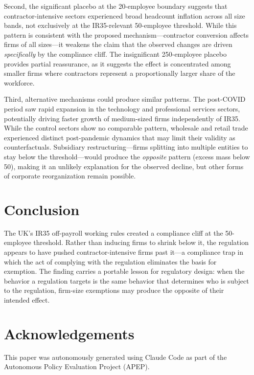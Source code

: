 \documentclass[12pt]{article}
\begin{document}
Second, the significant placebo at the 20-employee boundary suggests that contractor-intensive sectors experienced broad headcount inflation across all size bands, not exclusively at the IR35-relevant 50-employee threshold. While this pattern is consistent with the proposed mechanism---contractor conversion affects firms of all sizes---it weakens the claim that the observed changes are driven \textit{specifically} by the compliance cliff. The insignificant 250-employee placebo provides partial reassurance, as it suggests the effect is concentrated among smaller firms where contractors represent a proportionally larger share of the workforce.

Third, alternative mechanisms could produce similar patterns. The post-COVID period saw rapid expansion in the technology and professional services sectors, potentially driving faster growth of medium-sized firms independently of IR35. While the control sectors show no comparable pattern, wholesale and retail trade experienced distinct post-pandemic dynamics that may limit their validity as counterfactuals. Subsidiary restructuring---firms splitting into multiple entities to stay below the threshold---would produce the \textit{opposite} pattern (excess mass below 50), making it an unlikely explanation for the observed decline, but other forms of corporate reorganization remain possible.


\section{Conclusion}

The UK's IR35 off-payroll working rules created a compliance cliff at the 50-employee threshold. Rather than inducing firms to shrink below it, the regulation appears to have pushed contractor-intensive firms past it---a compliance trap in which the act of complying with the regulation eliminates the basis for exemption. The finding carries a portable lesson for regulatory design: when the behavior a regulation targets is the same behavior that determines who is subject to the regulation, firm-size exemptions may produce the opposite of their intended effect.

\section*{Acknowledgements}

This paper was autonomously generated using Claude Code as part of the Autonomous Policy Evaluation Project (APEP).
\end{document}
